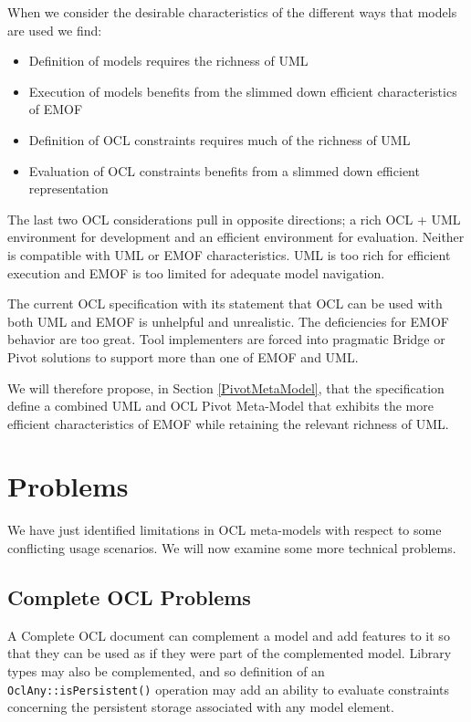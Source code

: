 \documentclass{eceasst}
\begin{document}
When we consider the desirable characteristics of the different ways that models are used we find:
\begin{itemize}
\item Definition of models requires the richness of UML
\item Execution of models benefits from the slimmed down efficient characteristics of EMOF 
\item Definition of OCL constraints requires much of the richness of UML
\item Evaluation of OCL constraints benefits from a slimmed down efficient representation
\end{itemize}

The last two OCL considerations pull in opposite directions; a rich OCL + UML environment for development and an efficient environment for evaluation. Neither is compatible with UML or EMOF characteristics. UML is too rich for efficient execution and EMOF is too limited for adequate model navigation.

The current OCL specification with its statement that OCL can be used with both UML and EMOF is unhelpful and unrealistic. The deficiencies for EMOF behavior are too great. Tool implementers are forced into pragmatic Bridge\cite{Bridge} or Pivot\cite{Pivot} solutions to support more than one of EMOF and UML. 

We will therefore propose, in Section \ref{PivotMetaModel},  that the specification define a combined UML and OCL Pivot Meta-Model that exhibits the more efficient characteristics of EMOF while retaining the relevant richness of UML.

\section{Problems}\label{Problems}

We have just identified limitations in OCL meta-models with respect to some conflicting usage scenarios. We will now examine some more technical problems.

\subsection{Complete OCL Problems}\label{CompleteOCL}

A Complete OCL document can complement a model and add features to it so that they can be used as if they were part of the complemented model. Library types may also be complemented, and so definition of an \verb|OclAny::isPersistent()| operation may add an ability to evaluate constraints concerning the persistent storage associated with any model element.
\end{document}
